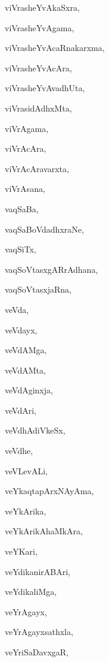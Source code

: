 \begin{multicols}{2}
{viVrasheYvAkaSxra}, \pageref{viVrasheYvAkaSxra}

{viVrasheYvAgama}, \pageref{viVrasheYvAgama}

{viVrasheYvAcaRnakarxma}, \pageref{viVrasheYvAcaRnakarxma}

{viVrasheYvAcAra}, \pageref{viVrasheYvAcAra}

{viVrasheYvAvadhUta}, \pageref{viVrasheYvAvadhUta}

{viVrasidAdhxMta}, \pageref{viVrasidAdhxMta}

{viVrAgama}, \pageref{viVrAgama}

{viVrAcAra}, \pageref{viVrAcAra}

{viVrAcAravarxta}, \pageref{viVrAcAravarxta}

{viVrAsana}, \pageref{viVrAsana}

{vaqSaBa}, \pageref{vaqSaBa}

{vaqSaBoVdadhxraNe}, \pageref{vaqSaBoVdadhxraNe}

{vaqSiTx}, \pageref{vaqSiTx}

{vaqSoVtasxgARrAdhana}, \pageref{vaqSoVtasxgARrAdhana}

{vaqSoVtasxjaRna}, \pageref{vaqSoVtasxjaRna}

{veVda}, \pageref{veVda}

{veVdayx}, \pageref{veVdayx}

{veVdAMga}, \pageref{veVdAMga}

{veVdAMta}, \pageref{veVdAMta}

{veVdAginxja}, \pageref{veVdAginxja}

{veVdAri}, \pageref{veVdAri}

{veVdhAdiVkeSx}, \pageref{veVdhAdiVkeSx}

{veVdhe}, \pageref{veVdhe}

{veVLevALi}, \pageref{veVLevALi}

{veYkaqtapArxNAyAma}, \pageref{veYkaqtapArxNAyAma}

{veYkArika}, \pageref{veYkArika}

{veYkArikAhaMkAra}, \pageref{veYkArikAhaMkAra}

{veYKari}, \pageref{veYKari}

{veYdikanirABAri}, \pageref{veYdikanirABAri}

{veYdikaliMga}, \pageref{veYdikaliMga}

{veYrAgayx}, \pageref{veYrAgayx}

{veYrAgayxsathxla}, \pageref{veYrAgayxsathxla}

{veYriSaDavxgaR}, \pageref{veYriSaDavxgaR}


\end{multicols}
